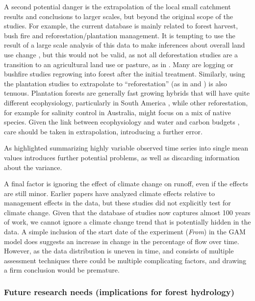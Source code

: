 \documentclass[]{elsarticle} %
\begin{document}
A second potential danger is the extrapolation of the local small catchment results and conclusions to larger scales, but beyond the original scope of the studies. For example, the current database is mainly related to forest harvest, bush fire and reforestation/plantation management. It is tempting to use the result of a large scale analysis of this data to make inferences about overall land use change \citep{li2017, wang2020}, but this would not be valid, as not all deforestation studies are a transition to an agricultural land use or pasture, as in \citet{levy2018}. Many are logging or bushfire studies regrowing into forest after the initial treatment. Similarly, using the plantation studies to extrapolate to ``reforestation'' (as in \citet{filoso2017} and \citet{hoekvandijke2022}) is also tenuous. Plantation forests are generally fast growing hybrids that will have quite different ecophysiology, particularly in South America \citep{jones2017, binkley2017}, while other reforestation, for example for salinity control in Australia, might focus on a mix of native species. Given the link between ecophysiology and water and carbon budgets \citep{jackson2005}, care should be taken in extrapolation, introducing a further error.

As highlighted summarizing highly variable observed time series into single mean values introduces further potential problems, as well as discarding information about the variance.

A final factor is ignoring the effect of climate change \citep{vervoort2021} on runoff, even if the effects are still minor. Earlier papers \citep{li2017, wang2020} have analyzed climate effects relative to management effects in the data, but these studies did not explicitly test for climate change. Given that the database of studies now captures almost 100 years of work, we cannot ignore a climate change trend that is potentially hidden in the data. A simple inclusion of the start date of the experiment (\emph{From}) in the GAM model does suggests an increase in change in the percentage of flow over time. However, as the data distribution is uneven in time, and consists of multiple assessment techniques there could be multiple complicating factors, and drawing a firm conclusion would be premature.

\hypertarget{future-research-needs-implications-for-forest-hydrology}{%
\subsubsection{Future research needs (implications for forest hydrology)}\label{future-research-needs-implications-for-forest-hydrology}}
\end{document}
